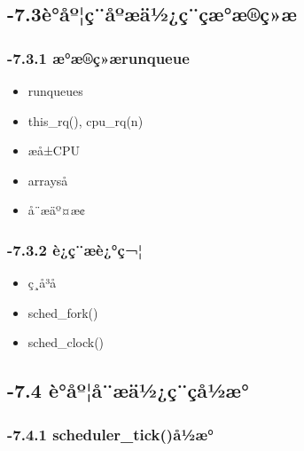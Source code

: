 \documentclass[11pt]{article}
\begin{document}
\subsection{-7.3è°åº¦ç¨åºæä½¿ç¨çæ°æ®ç»æ}
\label{sec-2.3}


\subsubsection{-7.3.1 æ°æ®ç»ærunqueue}
\label{sec-2.3.1}

\begin{itemize}
\item runqueues
\item this\_rq(), cpu\_rq(n)
\item æå±CPU
\item arrayså
\item å¨æäº¤æ¢
\end{itemize}
\subsubsection{-7.3.2 è¿ç¨æè¿°ç¬¦}
\label{sec-2.3.2}

\begin{itemize}
\item ç¸å³å
\item sched\_fork()
\item sched\_clock()
\end{itemize}
\subsection{-7.4 è°åº¦å¨æä½¿ç¨çå½æ°}
\label{sec-2.4}


\subsubsection{-7.4.1 scheduler\_tick()å½æ°}
\label{sec-2.4.1}
\end{document}
